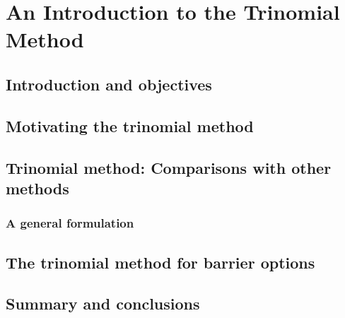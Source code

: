 \chapter{An Introduction to the Trinomial Method}

\section{Introduction and objectives}

\section{Motivating the trinomial method}

\section{Trinomial method: Comparisons with other methods}

\subsection{A general formulation}

\section{The trinomial method for barrier options}

\section{Summary and conclusions}